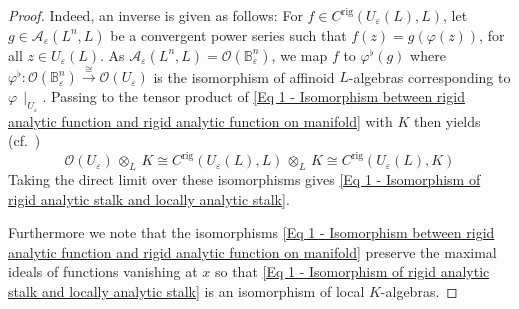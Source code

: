 \documentclass[a4paper, reqno, 10pt]{amsart}
\theoremstyle{definition}
\numberwithin{equation}{section}
\newcommand{\botimes}[1]{{\,\otimes_{#1}\,}}
\newcommand{\res}[1]{{\!\,\mid_{#1}}}
\newcommand{\rig}{{\mathrm{rig}}}
\newcommand{\BB}{{\mathbb {B}}}
\newcommand{\CA}{{\mathcal {A}}}
\newcommand{\CO}{{\mathcal {O}}}
\begin{document}
\begin{proof}
	Indeed, an inverse is given as follows:
	For $f \in C^\rig(U_\varepsilon(L),L)$, let $g \in \CA_\varepsilon (L^n, L)$ be a convergent power series such that $f(z) = g(\varphi(z))$, for all $z\in U_\varepsilon(L)$.
	As $\CA_\varepsilon (L^n, L) = \CO(\BB^n_\varepsilon)$, we map $f$ to $\varphi^\flat (g)$ where $\varphi^\flat \colon \CO(\BB^n_\varepsilon ) \xrightarrow{\cong} \CO(U_\varepsilon)$ is the isomorphism of affinoid $L$-algebras corresponding to $\varphi\res{U_\varepsilon}$.
	Passing to the tensor product of \eqref{Eq 1 - Isomorphism between rigid analytic function and rigid analytic function on manifold} with $K$ then yields (cf.\ \cite[\S 2.3]{Emerton17LocAnVect}) 
	\begin{equation*}
		\CO (U_\varepsilon) \botimes{L} K \cong C^\rig (U_\varepsilon(L),L) \botimes{L} K \cong C^\rig (U_\varepsilon(L),K)
	\end{equation*}
	Taking the direct limit over these isomorphisms gives \eqref{Eq 1 - Isomorphism of rigid analytic stalk and locally analytic stalk}.
	
	
	Furthermore we note that the isomorphisms \eqref{Eq 1 - Isomorphism between rigid analytic function and rigid analytic function on manifold} preserve the maximal ideals of functions vanishing at $x$ so that \eqref{Eq 1 - Isomorphism of rigid analytic stalk and locally analytic stalk} is an isomorphism of local $K$-algebras.	
\end{proof}
\end{document}
